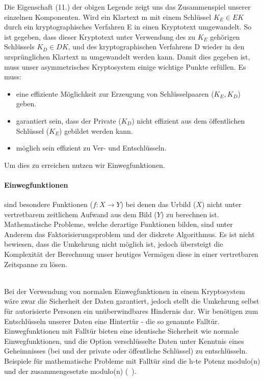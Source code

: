 \documentclass[paper=a4,11pt,german]{scrartcl} %
\begin{document}
Die Eigenschaft (11.) der obigen Legende zeigt uns das Zusammenspiel unserer einzelnen Komponenten. Wird ein Klartext m mit einem Schlüssel $K_E \in EK$ durch ein kryptographisches Verfahren E in einen Kryptotext umgewandelt. So ist gegeben, dass dieser Kryptotext unter Verwendung des zu $K_E$ gehörigen Schlüssels $K_D \in DK$, und des kryptographischen Verfahrens D wieder in den ursprünglichen Klartext m umgewandelt werden kann. Damit dies gegeben ist, muss unser asymmetrisches Kryptosystem einige wichtige Punkte erfüllen.
Es muss:
\newpage
\begin{itemize}
\item eine effiziente Möglichkeit zur Erzeugung von Schlüsselpaaren ($K_E,K_D$) geben.
\item garantiert sein, dass der Private ($K_D$) nicht effizient aus dem öffentlichen Schlüssel ($K_E$) gebildet werden kann.
\item möglich sein effizient zu Ver- und Entschlüsseln.
\end{itemize}
Um dies zu erreichen nutzen wir Einwegfunktionen.
\paragraph{Einwegfunktionen}
 sind besondere Funktionen ($f: X \rightarrow Y$) bei denen das Urbild ($X$) nicht unter vertretbarem zeitlichem Aufwand aus dem Bild ($Y$) zu berechnen ist. Mathematische Probleme, welche derartige Funktionen bilden, sind unter Anderem das Faktorisierungsproblem und der diskrete Algorithmus. Es ist nicht bewiesen, dass die Umkehrung nicht möglich ist, jedoch übersteigt die Komplexität der Berechnung unser heutiges Vermögen diese in einer vertretbaren Zeitspanne zu lösen.

\ \\
Bei der Verwendung von normalen Einwegfunktionen in einem Kryptosystem wäre zwar die Sicherheit der Daten garantiert, jedoch stellt die Umkehrung selbst für autorisierte Personen ein unüberwindbares Hindernis dar. Wir benötigen zum Entschlüsseln unserer Daten eine Hintertür - die so genannte Falltür. Einwegfunktionen mit Falltür bieten eine identische Sicherheit wie normale Einwegfunktionen, und die Option verschlüsselte Daten unter Kenntnis eines Geheimnisses (bei und der private oder öffentliche Schlüssel) zu entschlüsseln. Beispiele für mathematische Probleme mit Falltür sind die h-te Potenz modulo(n) und der zusammengesetzte modulo(n) (~\cite{Eckert13}). 
\end{document}
